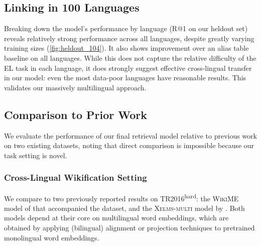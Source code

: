 \documentclass[11pt,a4paper]{article}
\newcommand*{\TR}{TR2016\textsuperscript{hard}}
\begin{document}
\subsection{Linking in 100 Languages}\label{sec:linking_in_100}
Breaking down the model's performance by language (R@1 on our heldout set) reveals relatively strong performance across all languages,
despite greatly varying training sizes (\autoref{fig:heldout_104}).
It also shows improvement over an alias table baseline on all languages.
While this does not capture the relative difficulty of the EL task in each language, it does strongly suggest effective cross-lingual transfer in our model: even the most data-poor languages have reasonable results.
This validates our massively multilingual approach.

\subsection{Comparison to Prior Work}\label{sec:eval_compare_to_prior_work}
We evaluate the performance of our final retrieval model relative to previous work on two existing datasets,
noting that direct comparison is impossible because our task setting is novel.

\subsubsection{Cross-Lingual Wikification Setting}\label{sec:eval_xel}
We compare to two previously reported results on \TR:
the \textsc{WikiME} model of  that accompanied the dataset, and
the \textsc{Xelms-multi} model by .
Both models depend at their core on multilingual word embeddings, which are obtained by applying (bilingual) alignment or projection techniques to pretrained monolingual word embeddings.
\end{document}
